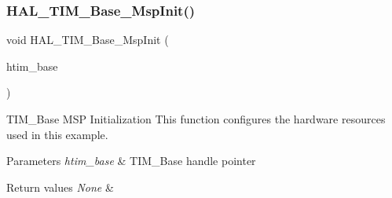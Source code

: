 \subsubsection{\texorpdfstring{H\+A\+L\+\_\+\+T\+I\+M\+\_\+\+Base\+\_\+\+Msp\+Init()}{HAL\_TIM\_Base\_MspInit()}}
{\footnotesize\ttfamily void H\+A\+L\+\_\+\+T\+I\+M\+\_\+\+Base\+\_\+\+Msp\+Init (\begin{DoxyParamCaption}\item[{\hyperlink{struct_t_i_m___handle_type_def}{T\+I\+M\+\_\+\+Handle\+Type\+Def} $\ast$}]{htim\+\_\+base }\end{DoxyParamCaption})}



T\+I\+M\+\_\+\+Base M\+SP Initialization This function configures the hardware resources used in this example. 


\begin{DoxyParams}{Parameters}
{\em htim\+\_\+base} & T\+I\+M\+\_\+\+Base handle pointer \\
\hline
\end{DoxyParams}

\begin{DoxyRetVals}{Return values}
{\em None} & \\
\hline
\end{DoxyRetVals}
